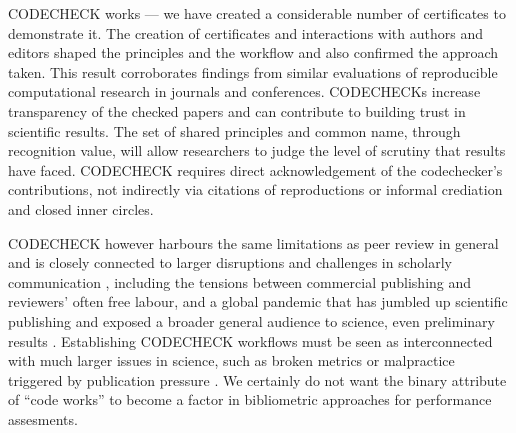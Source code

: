 \documentclass[12pt]{article}
\begin{document}
CODECHECK works --- we have created a considerable number of
certificates to demonstrate it.  The creation of certificates and
interactions with authors and editors shaped the principles and the
workflow and also confirmed the approach taken. This result
corroborates findings from similar evaluations of reproducible
computational research in journals and conferences.  CODECHECKs
increase transparency of the checked papers and can contribute to
building trust in scientific results.
The set of shared principles and common name, through recognition
value, will allow researchers to judge the level of scrutiny that
results have faced. CODECHECK requires direct acknowledgement of the
codechecker's contributions, not indirectly via citations of
reproductions or informal crediation and closed inner circles.

CODECHECK however harbours the same limitations as peer review in
general and is closely connected to larger disruptions and challenges
in scholarly communication
\cite{eglen_recent_2018,tennant_ten_2019,fyfe_mission_2019}, including
the tensions between commercial publishing and reviewers' often free
labour, and a global pandemic that has jumbled up scientific
publishing and exposed a broader general audience to science, even
preliminary results \cite{munafo_what_2020}.  Establishing CODECHECK
workflows must be seen as interconnected with much larger issues in
science, such as broken metrics or malpractice triggered by
publication pressure
\cite{piwowar_altmetrics:_2013,nosek_promoting_2015}.  We certainly do
not want the binary attribute of ``code works'' to become a factor in
bibliometric approaches for performance assesments.
\end{document}
